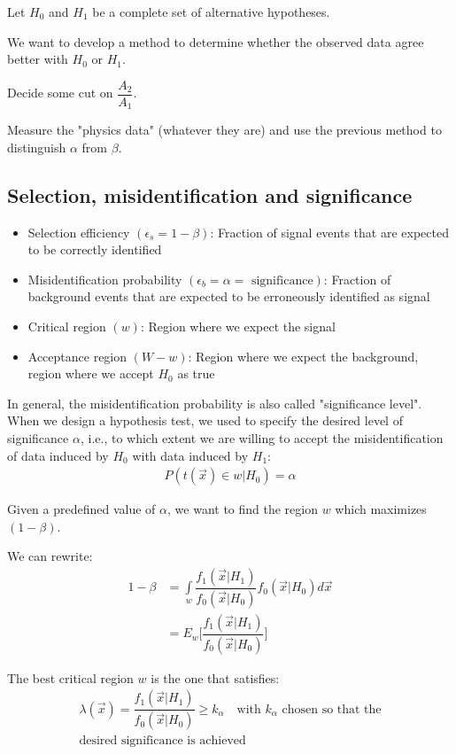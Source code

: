 Let $H_0$ and $H_1$ be a complete set of alternative hypotheses.

We want to develop a method to determine whether the observed data agree better with $H_0$ or $H_1$.

Decide some cut on $\dfrac{A_2}{A_1}$. 

Measure the "physics data" (whatever they are) and use the previous method to distinguish $\alpha$ from $\beta$. 

\subsection{Selection, misidentification and significance}
\begin{itemize}
  \item Selection efficiency $(\epsilon_s=1-\beta)$: Fraction of signal events that are expected to be correctly identified
  \item Misidentification probability $(\epsilon_b = \alpha = \text{ significance})$: Fraction of background events that are expected to be erroneously identified as signal 
  \item Critical region $(w)$: Region where we expect the signal
  \item Acceptance region $(W-w)$: Region where we expect the background, region where we accept $H_0$ as true
\end{itemize}
     
In general, the misidentification probability is also called "significance level". When we design a hypothesis test, we used to specify the desired level of significance $\alpha$, i.e., to which extent we are willing to accept the misidentification of data induced by $H_0$ with data induced by $H_1$:
\begin{align}
  P(t(\vec{x}) \in w | H_0) = \alpha
\end{align}

Given a predefined value of $\alpha$, we want to find the region $w$ which maximizes $(1-\beta)$.

We can rewrite: 
\begin{align}
  1 - \beta &= \int \limits_{w} \dfrac{f_1(\vec{x}|H_1)}{f_0(\vec{x}|H_0)} f_0(\vec{x}|H_0) d\vec{x} \\
            &= E_w \Big[\dfrac{f_1(\vec{x}| H_1)}{f_0(\vec{x}|H_0)}\Big]
\end{align}


The best critical region $w$ is the one that satisfies: 
\begin{align}
\lambda(\vec{x}) = \dfrac{f_1(\vec{x}|H_1)}{f_0(\vec{x}|H_0)} \geq k_\alpha \quad \text{with $k_\alpha$ chosen so that the} \nonumber \\ \text{desired significance is achieved}
\end{align}

